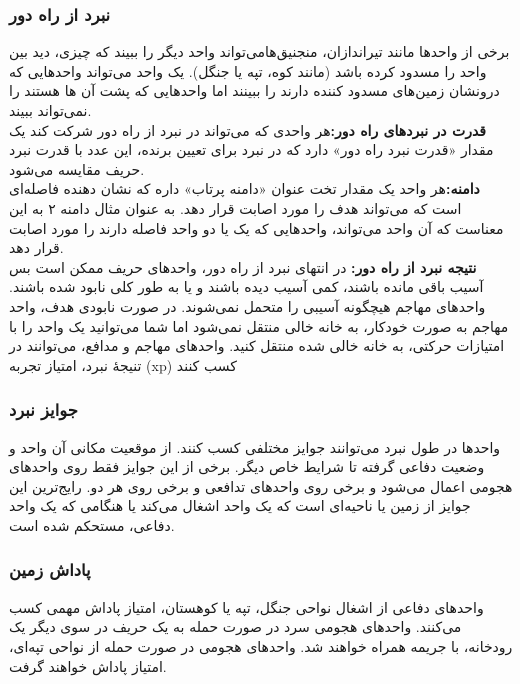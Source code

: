 \documentclass[]{article}
\begin{document}
\subsubsection*{{\titr نبرد از راه دور}}
برخی از واحدها مانند تیراندازان، منجنیق‌هامی‌تواند واحد دیگر را ببیند که چیزی، دید بین واحد را مسدود کرده باشد (مانند کوه، تپه یا جنگل). یک واحد می‌تواند واحد‌هایی که درونشان زمین‌های مسدود کننده دارند را ببینند اما واحد‌هایی که پشت آن ها هستند را نمی‌تواند ببیند.
\\\noindent \textbf{قدرت در نبردهای راه دور:}هر  واحدی که می‌تواند در نبرد از راه دور شرکت کند یک مقدار «قدرت نبرد راه دور» دارد که در نبرد برای تعیین برنده، این عدد با قدرت نبرد حریف مقایسه می‌شود.
\\\noindent \textbf{دامنه:}هر واحد یک مقدار تخت  عنوان «دامنه پرتاب» داره که نشان دهنده فاصله‌‌ای است که می‌تواند هدف را مورد اصابت قرار دهد. به عنوان مثال دامنه ۲ به این معناست که آن واحد می‌تواند، واحد‌هایی که یک یا دو واحد فاصله دارند را مورد اصابت قرار دهد.
\\\noindent \textbf{نتیجه نبرد از راه دور:} در انتهای نبرد از راه دور، واحد‌های حریف ممکن است بس آسیب باقی مانده باشند، کمی آسیب دیده باشند و یا به طور کلی نابود شده باشند. واحد‌های مهاجم هیچگونه آسیبی را متحمل نمی‌شوند. در صورت نابودی هدف، واحد مهاجم به صورت خودکار، به خانه خالی منتقل نمی‌شود اما شما می‌توانید یک واحد را با امتیازات حرکتی، به خانه خالی شده منتقل کنید. واحد‌های مهاجم و مدافع، می‌توانند در تنیجۀ نبرد، امتیاز تجربه (xp) کسب کنند
\subsubsection*{{\titr جوایز نبرد}}
واحد‌ها در طول نبرد می‌توانند جوایز مختلفی کسب کنند. از موقعیت مکانی آن واحد و وضعیت دفاعی گرفته تا شرایط خاص دیگر. برخی از این جوایز فقط روی واحد‌های هجومی اعمال می‌شود و برخی روی واحد‌های تدافعی و برخی روی هر دو. رایج‌ترین این جوایز از زمین یا ناحیه‌ای است که یک واحد اشغال می‌کند یا هنگامی که یک واحد دفاعی، مستحکم شده است.
\subsubsection*{{\titr پاداش زمین}}
واحد‌های دفاعی از اشغال نواحی جنگل، تپه یا کوهستان، امتیاز پاداش مهمی کسب می‌کنند. واحد‌های هجومی سرد در صورت حمله به یک حریف در سوی دیگر یک رودخانه، با جریمه همراه خواهند شد. واحد‌های هجومی در صورت حمله از نواحی تپه‌ای، امتیاز پاداش خواهند گرفت.
\end{document}
